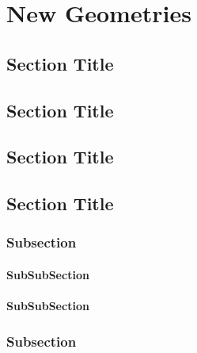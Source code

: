 \chapter{New Geometries}
\section{Section Title}

\section{Section Title}

\section{Section Title}

\section{Section Title}
\subsection{Subsection}

\subsubsection{SubSubSection}

\subsubsection{SubSubSection}

\subsection{Subsection}

